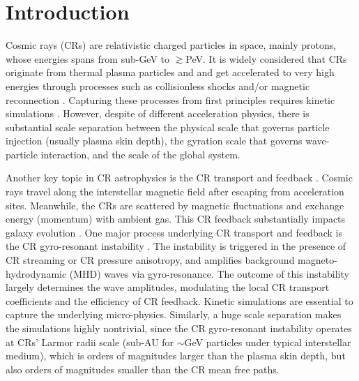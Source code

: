 \documentclass[fleqn,usenatbib]{mnras}
\begin{document}
\section{Introduction}
Cosmic rays (CRs) are relativistic charged particles in space, mainly protons, whose energies spans from sub-GeV to $\gtrsim$PeV. It is widely considered that CRs originate from thermal plasma particles and and get accelerated to very high energies through processes such as collisionless shocks \citep[e.g.,][]{1977ICRC....2..273A, 1977DoSSR.234.1306K,1978ApJ...221L..29B, 1978MNRAS.182..443B} and/or magnetic reconnection \citep[e.g.,][]{1998PhPl....5.1599K,2000mare.book.....P, 2022NatRP...4..263J}. Capturing these processes from first principles requires kinetic simulations \citep[e.g.,][]{2011ApJ...726...75S, 2013ApJ...773..158G, 2014ApJ...783...91C, 2014PhRvL.113o5005G, 2014ApJ...783L..21S, 2015ApJ...798L..28C, 2015ApJ...806..167G}.
However, despite of different acceleration physics, there is substantial scale separation between the physical scale that governs particle injection (usually plasma skin depth), the gyration scale that governs wave-particle interaction, and the scale of the global system. 

Another key topic in CR astrophysics is the CR transport and feedback \citep[e.g.,][]{2001RvMP...73.1031F,2017PhPl...24e5402Z, 2017ARA&A..55...59N}. Cosmic rays travel along the interstellar magnetic field after escaping from acceleration sites. Meanwhile, the CRs are scattered by magnetic fluctuations and exchange energy (momentum) with ambient gas. This CR feedback substantially impacts galaxy evolution \citep[e.g.,][]{2015ARA&A..53..199G, 2020MNRAS.496.4221J, 2022MNRAS.tmp.1768H, 2022MNRAS.514..657K}. One major process underlying CR transport and feedback is the CR gyro-resonant instability \citep{1969ApJ...156..445K, 1974ARA&A..12...71W, 1975MNRAS.173..255S, 1975MNRAS.173..245S, 1975MNRAS.172..557S, 2006MNRAS.373.1195L, 2011ApJ...731...35Y, 2020ApJ...890...67Z}. The instability is triggered in the presence of CR streaming or CR pressure anisotropy, and amplifies background magneto-hydrodynamic (MHD) waves via gyro-resonance. The outcome of this instability largely determines the wave amplitudes, modulating the local CR transport coefficients and the efficiency of CR feedback. 
Kinetic simulations \citep{2019ApJ...882....3H, 2019ApJ...876...60B, 2019ICRC...36..279H, 2021ApJ...920..141B, 2022ApJ...928..112B} are essential to capture the underlying micro-physics. Similarly, a huge scale separation makes the simulations highly nontrivial, since the CR gyro-resonant instability operates at CRs' Larmor radii scale (sub-AU for $\sim$GeV particles under typical interstellar medium), which is orders of magnitudes larger than the plasma skin depth, but also orders of magnitudes smaller than the CR mean free paths.
\end{document}
